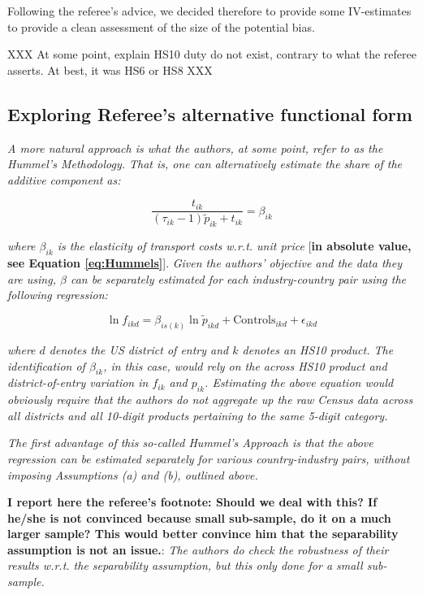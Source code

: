 \documentclass[a4paper,12pt]{article}
\begin{document}
Following the referee's advice, we decided therefore to provide some IV-estimates to provide a clean assessment of the size of the potential bias.


XXX At some point, explain HS10 duty do not exist, contrary to what the referee asserts. At best, it was HS6 or HS8 XXX


\subsection{Exploring Referee's alternative functional form}


\textit{A more natural approach is what the authors, at some point, refer to as the
Hummel's Methodology. That is, one can alternatively estimate the share of the
additive component as:}

$$\frac{t_{ik}}{ (\tau_{ik}-1)\tilde{p}_{ik} + t_{ik}} = \beta_{ik}$$

\textit{where $\beta_{ik}$ is the elasticity of transport costs w.r.t. unit price} [\textbf{in absolute value, see Equation \ref{eq:Hummels}}]. \textit{Given the authors' objective and the data they are using, $\beta$ can be separately estimated
for each industry-country pair using the following regression:}

\begin{equation}
\ln f_{ikd} = \beta_{is(k)}\ln \tilde{p}_{ikd} + \text{Controls}_{ikd} +\epsilon_{ikd} \label{eq:estimation_ref1}
\end{equation}

\textit{where $d$ denotes the US district of entry and $k$ denotes an HS10 product. The
identification of $\beta_{ik}$, in this case, would rely on the across HS10 product and
district-of-entry variation in $f_{ik}$ and $p_{ik}$. Estimating the above equation would
obviously require that the authors do not aggregate up the raw Census data
across all districts and all 10-digit products pertaining to the same 5-digit category.}

\textit{The first advantage of this so-called Hummel's Approach is that the above
regression can be estimated separately for various country-industry pairs, without
imposing Assumptions (a) and (b), outlined above.}

\textbf{I report here the referee's footnote: Should we deal with this? If he/she is not convinced because small sub-sample, do it on a much larger sample? This would better convince him that the separability assumption is not an issue.}: \textit{The authors do check the robustness of their results w.r.t. the separability assumption, but this only done for a small sub-sample.}
\end{document}
